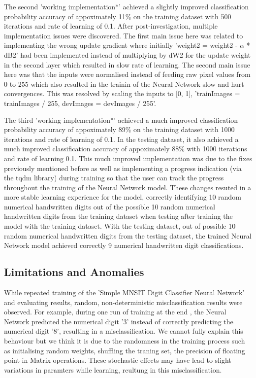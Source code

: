 \documentclass[11pt]{article}
\begin{document}
\vspace{1em}
The second 'working implementation*' achieved a slightly improved classification probability accuracy of appoximately 11\% on the training dataset with 500 iterations and rate of learning of 0.1. After post-investigation, multiple implementation issues were discovered. The first main issue here was related to implementing the wrong update gradient where initially 'weight2 = weight2 - $\alpha$ * dB2' had been implemented instead of multiplying by dW2 for the update weight in the second layer which resulted in slow rate of learning. The second main issue here was that the inputs were normalised instead of feeding raw pixel values from 0 to 255 which also resulted in the trainin of the Neural Network slow and hurt convergences. This was resolved by scaling the inputs to [0, 1], 'trainImages = trainImages / 255, devImages = devImages / 255'.

\vspace{1em}
The third 'working implementation*' achieved a much improved classification probability accuracy of appoximately 89\% on the training dataset with 1000 iterations and rate of learning of 0.1. In the testing dataset, it also achieved a much improved classification accuracy of appoximately 88\% with 1000 iterations and rate of learning 0.1. This much improved implementation was due to the fixes previously mentioned before as well as implementing a progress indication (via the tqdm library) during training so that the user can track the progress throughout the training of the Neural Network model. These changes resuted in a more stable learning experience for the model, correctly identifying 10 random numerical handwritten digits out of the possible 10 random numerical handwritten digits from the training dataset when testing after training the model with the training dataset. With the testing dataset, out of possible 10 random numerical handwritten digits from the testing dataset, the trained Neural Network model achieved correctly 9 numerical handwritten digit classifications.

\subsection{Limitations and Anomalies}
While repeated training of the 'Simple MNSIT Digit Classifier Neural Network' and evaluating results, random, non-deterministic misclassification results were observed. For example, during one run of training at the end \cite{result}, the Neural Network predicted the numerical digit '3' instead of correctly predicting the numerical digit '8', resulting in a misclassification. We cannot fully explain this behaviour but we think it is due to the randomness in the training process such as initialising random weights, shuffling the traning set, the precision of floating point in Matrix operations. These stochastic effects may have lead to slight variations in paramters while learning, reultung in this misclassification.
\end{document}
